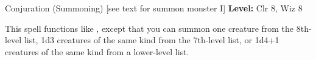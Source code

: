 {Conjuration (Summoning) [see text for summon monster I]}
{
	\textbf{Level:}
	Clr 8, Wiz 8\\
}
{
	This spell functions like , except that you can summon one creature from the 8th-level list, 1d3 creatures of the same kind from the 7th-level list, or 1d4+1 creatures of the same kind from a lower-level list.

}
